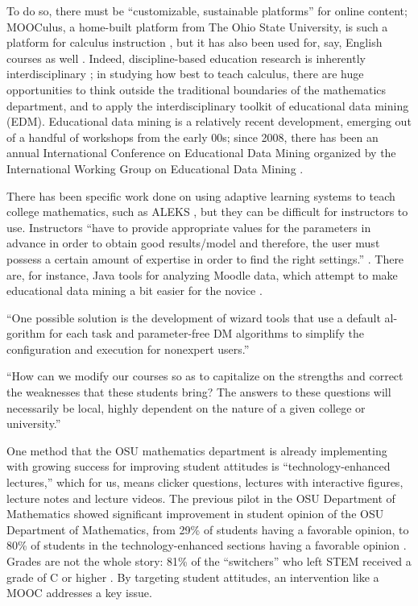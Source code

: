 \documentclass[12pt]{article}
\begin{document}
To do so, there must be ``customizable, sustainable
platforms'' \parencite{bowen2013higher} for online content; MOOCulus,
a home-built platform from The Ohio State University, is such a
platform for calculus instruction \parencite{evans}, but it has also
been used for, say, English courses as
well \parencite{gates-foundation-grant}.  Indeed, discipline-based
education research is inherently interdisciplinary \cite{dber-report};
in studying how best to teach calculus, there are huge opportunities
to think outside the traditional boundaries of the mathematics
department, and to apply the interdisciplinary toolkit of educational
data mining (EDM).  Educational data mining is a relatively recent
development, emerging out of a handful of workshops from the early
00s; since 2008, there has been an annual International Conference on
Educational Data Mining organized by the International Working Group
on Educational Data Mining \parencite{WIDM:WIDM1075}.

There has been specific work done on using adaptive learning systems
to teach college mathematics, such as
ALEKS \parencite{hagerty2005using}, but they can be difficult for
instructors to use.  Instructors ``have to provide appropriate values
for the parameters in advance in order to obtain good results/model
and therefore, the user must possess a certain amount of expertise in
order to find the right settings.'' \parencite{romero2010educational}.
There are, for instance, Java tools for analyzing Moodle data, which
attempt to make educational data mining a bit easier for the
novice \parencite{java-data-mining}.


     ``One possible solution
is the development of wizard tools that use a default al- gorithm for
each task and parameter-free DM algorithms to simplify the
configuration and execution for nonexpert users.''



``How can we modify our courses so as to capitalize on the strengths
and correct the weaknesses that these students bring?  The answers to
these questions will necessarily be local, highly dependent on the
nature of a given college or university.'' \cite{bressoud-sky-falling}



One method that the OSU mathematics department is already implementing
with growing success for improving student attitudes is
``technology-enhanced lectures,'' which for us, means clicker
questions, lectures with interactive figures, lecture notes and
lecture videos.  The previous pilot in the OSU Department of
Mathematics showed significant improvement in student opinion of the
OSU Department of Mathematics, from 29\% of students having a
favorable opinion, to 80\% of students in the technology-enhanced
sections having a favorable opinion
\cite{miller-tech-enhanced-calculus}.  Grades are not the whole story:
81\% of the ``switchers'' who left STEM received a grade of C or
higher \cite{calculus-programs}.  By targeting student attitudes, an
intervention like a MOOC addresses a key issue.
\end{document}
